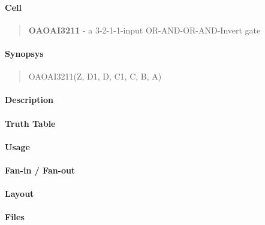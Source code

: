 \label{OAOAI3211}
\paragraph{Cell}
\begin{quote}
    \textbf{OAOAI3211} - a 3-2-1-1-input OR-AND-OR-AND-Invert gate
\end{quote}

\paragraph{Synopsys}
\begin{quote}
    OAOAI3211(Z, D1, D, C1, C, B, A)
\end{quote}

\paragraph{Description}

%

\paragraph{Truth Table}
%

\paragraph{Usage}

\paragraph{Fan-in / Fan-out}

\paragraph{Layout}

\paragraph{Files}
